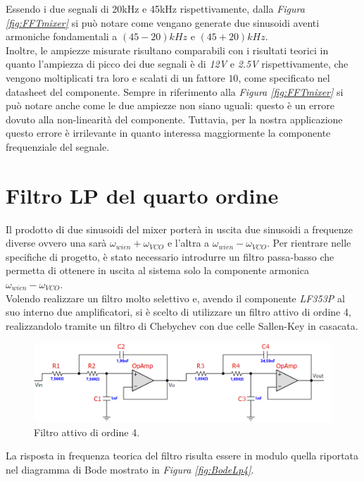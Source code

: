 \documentclass[titlepage]{report}
\begin{document}
	 \noindent Essendo i due segnali di 20kHz e 45kHz rispettivamente, dalla \textit{Figura \ref{fig:FFTmixer}} si può notare come vengano generate due sinusoidi aventi armoniche fondamentali a $(45-20)kHz$ e $(45+20)kHz$. 
	 \\
	 Inoltre, le ampiezze misurate risultano comparabili con i risultati teorici in quanto l'ampiezza di picco dei due segnali è di \textit{12V} e \textit{2.5V} rispettivamente, che vengono moltiplicati tra loro e scalati di un fattore $10$, come specificato nel datasheet del componente. Sempre in riferimento alla \textit{Figura \ref{fig:FFTmixer}} si può notare anche come le due ampiezze non siano uguali: questo è un errore dovuto alla non-linearità del componente. Tuttavia, per la nostra applicazione questo errore è irrilevante in quanto interessa maggiormente la componente frequenziale del segnale.
	

\section{Filtro LP del quarto ordine}
	\label{sec:LP4}
	Il prodotto di due sinusoidi del mixer porterà in uscita due sinusoidi a frequenze diverse ovvero una sarà $\omega_{wien} + \omega_{VCO}$ e l'altra a $\omega_{wien} - \omega_{VCO}$. Per rientrare nelle specifiche di progetto, è stato necessario introdurre un filtro passa-basso che permetta di ottenere in uscita al sistema solo la componente armonica $\omega_{wien} - \omega_{VCO}$.
	\\ 
	Volendo realizzare un filtro molto selettivo e, avendo il componente \textit{LF353P} al suo interno due amplificatori, si è scelto di utilizzare un filtro attivo di ordine 4, realizzandolo tramite un filtro di Chebychev con due celle Sallen-Key in casacata. 
	
	\begin{figure}[H]
		\centering
		\includegraphics[scale=0.9]{Immagini/sch_lp4.png}
		\caption{Filtro attivo di ordine 4.}
		\label{fig:LP4}
	\end{figure}	
	
	\noindent La risposta in frequenza teorica del filtro risulta essere in modulo quella riportata nel diagramma di Bode mostrato in \textit{Figura \ref{fig:BodeLp4}}.
	
\end{document}

